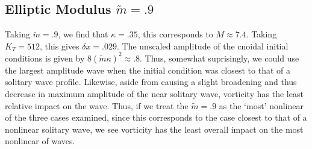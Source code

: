 \documentclass[a4paper,11pt]{article}
\begin{document}
\subsection*{Elliptic Modulus $\tilde{m}=.9$}
Taking $\tilde{m}=.9$, we find that $\kappa = .35$, this corresponds to $M \approx 7.4$.  Taking $K_{T}=512$, this gives $\delta x = .029$.  The unscaled amplitude of the cnoidal initial conditions is given by $8(\tilde{m}\kappa)^{2}\approx .8$.  Thus, somewhat suprisingly, we could use the largest amplitude wave when the initial condition was closest to that of a solitary wave profile.  Likewise, aside from causing a slight broadening and thus decrease in maximum amplitude of the near solitary wave, vorticity has the least relative impact on the wave.  Thus, if we treat the $\tilde{m}=.9$ as the `most' nonlinear of the three cases examined, since this corresponds to the case closest to that of a nonlinear solitary wave, we see vorticity has the least overall impact on the most nonlinear of waves.  
\end{document}
